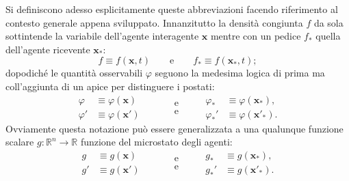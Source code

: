         Si definiscono adesso esplicitamente queste abbreviazioni facendo riferimento al contesto generale appena sviluppato. Innanzitutto la densità congiunta \(f\) da sola sottintende la variabile dell'agente interagente \(\mathbf x\) mentre con un pedice \(f_*\) quella dell'agente ricevente \(\mathbf x_*\):
        \newcommand\valtmp{2em}
        \begin{equation*}
          \newcommand\hspc{\hspace{\valtmp}}
          f\equiv f(\mathbf x,t)
          \hspc\text{e}\hspc
          f_*\equiv f(\mathbf x_*,t);
        \end{equation*}
        dopodiché le quantità osservabili \(\varphi\) seguono la medesima logica di prima ma coll'aggiunta di un apice per distinguere i postati:
        \begin{equation*}
          \newcommand\hspc{\hspace{\valtmp}}
          \begin{aligned}
            \varphi&\equiv\varphi(\mathbf x)\\
            \varphi'&\equiv\varphi(\mathbf x')
          \end{aligned}
          \hspc
          \begin{aligned}
            &\text{e}\\
            &\text{e}
          \end{aligned}
          \hspc
          \begin{aligned}
            \varphi_*&\equiv\varphi(\mathbf x_*),\\
            \varphi_*'&\equiv\varphi(\mathbf x'_*).
          \end{aligned}
        \end{equation*}
        Ovviamente questa notazione può essere generalizzata a una qualunque funzione scalare \(g\colon\mathbb R^n\to\mathbb R\) funzione del microstato degli agenti:
        \begin{equation*}
          \newcommand\hspc{\hspace{\valtmp}}
          \begin{aligned}
            g&\equiv g(\mathbf x)\\
            g'&\equiv g(\mathbf x')
          \end{aligned}
          \hspc
          \begin{aligned}
            &\text{e}\\
            &\text{e}
          \end{aligned}
          \hspc
          \begin{aligned}
            g_*&\equiv g(\mathbf x_*),\\
            g_*'&\equiv g(\mathbf x'_*).
          \end{aligned}
        \end{equation*}
